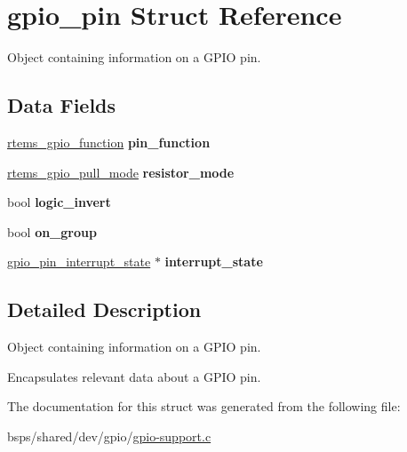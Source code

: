 \hypertarget{structgpio__pin}{}\section{gpio\+\_\+pin Struct Reference}
\label{structgpio__pin}


Object containing information on a G\+P\+IO pin.  


\subsection*{Data Fields}
\begin{DoxyCompactItemize}
\item 
\mbox{\label{structgpio__pin_aad671a7769cef9d30afd22dd88445f07}} 
\mbox{\hyperlink{gpio_8h_a0dec0f66d467b092b41dafe3d731a0d1}{rtems\+\_\+gpio\+\_\+function}} {\bfseries pin\+\_\+function}
\item 
\mbox{\label{structgpio__pin_ad200eb7c8999f430dde0d5b0f7c4440c}} 
\mbox{\hyperlink{gpio_8h_add28697559b41893e0754f35509bf835}{rtems\+\_\+gpio\+\_\+pull\+\_\+mode}} {\bfseries resistor\+\_\+mode}
\item 
\mbox{\label{structgpio__pin_a0ec5347968a94fb4b715aa90659e5090}} 
bool {\bfseries logic\+\_\+invert}
\item 
\mbox{\label{structgpio__pin_a8e18e7ddcb8029596e1951978ef837e4}} 
bool {\bfseries on\+\_\+group}
\item 
\mbox{\label{structgpio__pin_acd8397a30aa84f8c2365b3fb06eac641}} 
\mbox{\hyperlink{structgpio__pin__interrupt__state}{gpio\+\_\+pin\+\_\+interrupt\+\_\+state}} $\ast$ {\bfseries interrupt\+\_\+state}
\end{DoxyCompactItemize}


\subsection{Detailed Description}
Object containing information on a G\+P\+IO pin. 

Encapsulates relevant data about a G\+P\+IO pin. 

The documentation for this struct was generated from the following file\+:\begin{DoxyCompactItemize}
\item 
bsps/shared/dev/gpio/\mbox{\hyperlink{gpio-support_8c}{gpio-\/support.\+c}}\end{DoxyCompactItemize}
